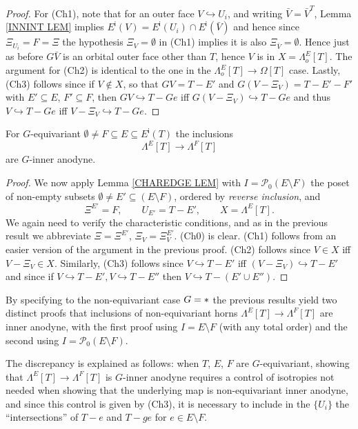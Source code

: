 \documentclass[a4paper,10pt,draft]{article}%
\begin{document}
\begin{proof}
For (Ch1), note that for an outer face 
$V \hookrightarrow U_i$, and writing $\bar{V} = \bar{V}^T$,
Lemma \ref{INNINT LEM} implies
$E^{\mathsf{i}}(V) = E^{\mathsf{i}}(U_i) \cap E^{\mathsf{i}}(\bar{V})$
and hence since $\Xi_{U_i} = F = \Xi$ the 
hypothesis $\Xi_{V} = \emptyset$ in (Ch1) implies it is also
$\Xi_{\bar{V}} = \emptyset$.
Hence just as before $G\bar{V}$ is an orbital outer face other than $T$, hence $V$ is in $X=\Lambda_o^{E}[T]$.
The argument for (Ch2) is identical to the one in the
$\Lambda_o^{E}[T] \to \Omega[T]$ case.
Lastly, (Ch3) follows since	if $V \not \in X$, so that
$GV = T - E'$ and $G(V - \Xi_V) = T-E'-F'$ with
$E' \subseteq E$, $F' \subseteq F$,
then $GV \hookrightarrow T-Ge$ iff $G(V - \Xi_V) \hookrightarrow T-Ge$
and thus $V \hookrightarrow T-Ge$ iff $V - \Xi_V \hookrightarrow T-Ge$.
\end{proof}


\begin{proposition}\label{REG_HORN_PROP}
For $G$-equivariant 
$\emptyset \neq F \subseteq E \subseteq E^{\mathsf{i}}(T)$
the inclusions
\begin{equation}
	\Lambda^{E}[T] \to \Lambda^{F}[T]
\end{equation}
are $G$-inner anodyne.
\end{proposition}

\begin{proof}
We now apply Lemma \ref{CHAREDGE LEM} with 
$I = \mathcal{P}_0(E\setminus F)$
the poset of non-empty subsets $\emptyset \neq E' \subseteq (E \setminus F)$, ordered by \textit{reverse inclusion}, and
\[
	\Xi^{E'} = F, \qquad
	U_{E'} = T - E', \qquad
	X=\Lambda^{E}[T].
\]
We again need to verify the characteristic conditions,
and as in the previous result we abbreviate
$\Xi = \Xi^{E'}$, $\Xi_V = \Xi^{E'}_V$.
(Ch0) is clear. (Ch1) follows from an easier version of the argument in the previous proof.
(Ch2) follows since $V \in X$ iff $V-\Xi_V \in X$.
Similarly,
(Ch3) follows since 
$V \hookrightarrow T-E'$ iff $(V-\Xi_V) \hookrightarrow T-E'$
and since if
$V \hookrightarrow T-E',V \hookrightarrow T-E''$
then 
$V \hookrightarrow T-(E' \cup E'')$.
\end{proof}


\begin{remark}\label{TWOPROOF REM}
	By specifying to the non-equivariant case $G = \**$
	the previous results yield two distinct proofs
	that inclusions of non-equivariant horns
	$\Lambda^{E}[T] \to \Lambda^{F}[T]$
	are inner anodyne,
	with the first proof using $I = E \setminus F$ (with any total order) and the second using 
	$I = \mathcal{P}_0(E \setminus F)$. 

	The discrepancy is explained as follows: 
	when $T$, $E$, $F$ are $G$-equivariant, showing that
	$\Lambda^{E}[T] \to \Lambda^{F}[T]$ 
	is $G$-inner anodyne requires a control of isotropies 
	not needed when showing that the underlying map is non-equivariant inner anodyne, and since this control is given by (Ch3), it is necessary to include in the $\{U_i\}$ the
	``intersections'' of $T-e$ and $T-ge$ for $e \in E \setminus F$. 
\end{remark}
\end{document}
